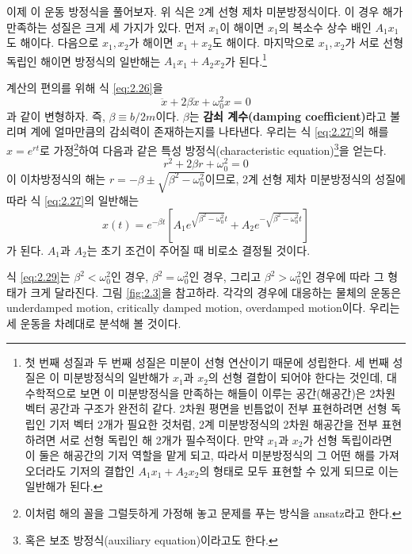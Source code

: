 \documentclass[chapter, oneside, b5paper]{oblivoir}
\theoremstyle{plain}
\theoremstyle{definition}
\theoremstyle{remark}
\begin{document}
이제 이 운동 방정식을 풀어보자. 위 식은 2계 선형 제차 미분방정식이다. 이 경우 해가 만족하는 성질은 크게 세 가지가 있다. 먼저 $x_1$이 해이면 $x_1$의 복소수 상수 배인 $A_1x_1$도 해이다. 다음으로 $x_1, x_2$가 해이면 $x_1+x_2$도 해이다. 마지막으로 $x_1, x_2$가 서로 선형 독립인 해이면 방정식의 일반해는 $A_1x_1+A_2x_2$가 된다.\footnote{첫 번째 성질과 두 번째 성질은 미분이 선형 연산이기 때문에 성립한다. 세 번째 성질은 이 미분방정식의 일반해가 $x_1$과 $x_2$의 선형 결합이 되어야 한다는 것인데, 대수학적으로 보면 이 미분방정식을 만족하는 해들이 이루는 공간(해공간)은 2차원 벡터 공간과 구조가 완전히 같다. 2차원 평면을 빈틈없이 전부 표현하려면 선형 독립인 기저 벡터 2개가 필요한 것처럼, 2계 미분방정식의 2차원 해공간을 전부 표현하려면 서로 선형 독립인 해 2개가 필수적이다. 만약 $x_1$과 $x_2$가 선형 독립이라면 이 둘은 해공간의 기저 역할을 맡게 되고, 따라서 미분방정식의 그 어떤 해를 가져오더라도 기저의 결합인 $A_1x_1 + A_2x_2$의 형태로 모두 표현할 수 있게 되므로 이는 일반해가 된다.}

계산의 편의를 위해 식 \ref{eq:2.26}을
\begin{equation}
    \ddot{x}+2\beta\dot{x}+\omega_0^2x=0 \label{eq:2.27}
\end{equation}
과 같이 변형하자. 즉, $\beta \equiv b/2m$이다. $\beta$는 \textbf{감쇠 계수(damping coefficient)}라고 불리며 계에 얼마만큼의 감쇠력이 존재하는지를 나타낸다. 우리는 식 \ref{eq:2.27}의 해를 $x=e^{rt}$로 가정\footnote{이처럼 해의 꼴을 그럴듯하게 가정해 놓고 문제를 푸는 방식을 ansatz라고 한다.}하여 다음과 같은 특성 방정식(characteristic equation)\footnote{혹은 보조 방정식(auxiliary equation)이라고도 한다.}을 얻는다.
\begin{equation}
    r^2+2\beta r + \omega_0^2 = 0 \label{eq:2.28}
\end{equation}
이 이차방정식의 해는 $r = -\beta \pm \sqrt{\beta^2-\omega_0^2}$이므로, 2계 선형 제차 미분방정식의 성질에 따라 식 \ref{eq:2.27}의 일반해는
\begin{equation}
    x(t) = e^{-\beta t}[A_1e^{\sqrt{\beta^2-\omega_0^2}t}+A_2e^{-\sqrt{\beta^2-\omega_0^2}t}] \label{eq:2.29}
\end{equation}가 된다. $A_1$과 $A_2$는 초기 조건이 주어질 때 비로소 결정될 것이다.

식 \ref{eq:2.29}는 $\beta^2 < \omega_0^2$인 경우, $\beta^2 = \omega_0^2$인 경우, 그리고 $\beta^2 > \omega_0^2$인 경우에 따라 그 형태가 크게 달라진다. 그림 \ref{fig:2.3}을 참고하라. 각각의 경우에 대응하는 물체의 운동은 underdamped motion, critically damped motion, overdamped motion이다. 우리는 세 운동을 차례대로 분석해 볼 것이다.
\end{document}
